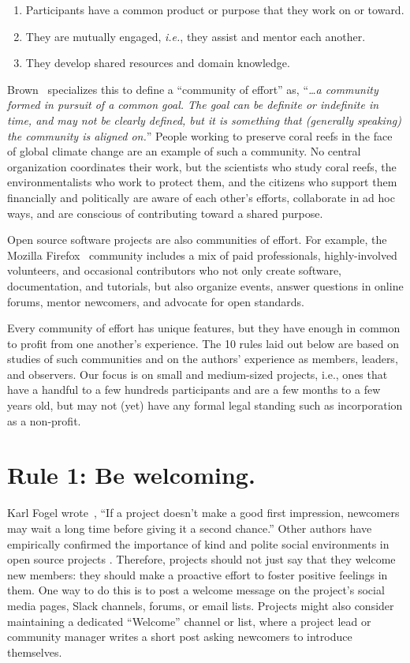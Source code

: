 \documentclass[10pt,letterpaper]{article}
\newcommand{\rulemajor}[1]{\section*{#1}}
\begin{document}
\begin{enumerate}

\item Participants have a common product or purpose that they work on or toward.

\item They are mutually engaged, \textit{i.e.}, they assist and mentor each another.

\item They develop shared resources and domain knowledge.

\end{enumerate}

Brown~\cite{brown2019} specializes this to define a ``community of effort'' as,
``\textit{{\ldots}a community formed in pursuit of a common goal.
The goal can be definite or indefinite in time,
and may not be clearly defined,
but it is something that (generally speaking) the community is aligned on.}''
People working to preserve coral reefs in the face of global climate change
are an example of such a community.
No central organization coordinates their work,
but the scientists who study coral reefs,
the environmentalists who work to protect them,
and the citizens who support them financially and politically
are aware of each other's efforts,
collaborate in ad hoc ways,
and are conscious of contributing toward a shared purpose.

Open source software projects are also communities of effort.
For example,
the Mozilla Firefox~\cite{mozilla} community includes a mix of paid professionals,
highly-involved volunteers,
and occasional contributors who not only create software,
documentation,
and tutorials,
but also organize events,
answer questions in online forums,
mentor newcomers,
and advocate for open standards.

Every community of effort has unique features,
but they have enough in common to profit from one another's experience.
The 10 rules laid out below are based on studies of such communities
and on the authors' experience as members, leaders, and observers.
Our focus is on small and medium-sized projects,
i.e., ones that have a handful to a few hundreds participants
and are a few months to a few years old,
but may not (yet) have any formal legal standing
such as incorporation as a non-profit.

\rulemajor{Rule 1: Be welcoming.}

Karl Fogel wrote~\cite{fogel2005},
``If a project doesn't make a good first impression, newcomers may wait a long time before giving it a second chance.''
Other authors have empirically confirmed the importance of kind and polite social environments
in open source projects \cite{singh2012,steinmacher2013,steinmacher2018a}.
Therefore, projects should not just say that they welcome new members:
they should make a proactive effort to foster positive feelings in them.
One way to do this is to post a welcome message on the project's social media pages, Slack channels, forums, or email lists.
Projects might also consider maintaining a dedicated ``Welcome'' channel or list,
where a project lead or community manager writes a short post asking newcomers to introduce themselves.
\end{document}
